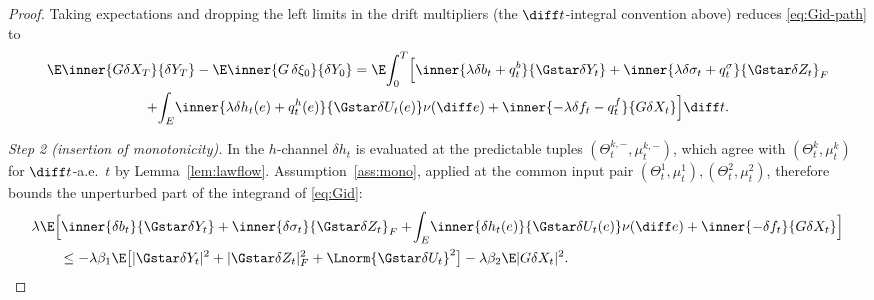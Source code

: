 \begin{proof}
Taking expectations and dropping the left limits in the drift multipliers (the
$\diff t$-integral convention above) reduces \eqref{eq:Gid-path} to
\begin{multline}\label{eq:Gid}
\E\inner{G\delta X_T}{\delta Y_T}-\E\inner{G\,\delta\xi_0}{\delta Y_0}
=\E\!\int_0^T\!\Big[\inner{\lambda\delta b_t+q^b_t}{\Gstar\delta Y_t}
+\inner{\lambda\delta\sigma_t+q^\sigma_t}{\Gstar\delta Z_t}_F\\
+\!\int_E\!\inner{\lambda\delta h_t(e)+q^h_t(e)}{\Gstar\delta U_t(e)}\nu(\diff e)
+\inner{-\lambda\delta f_t-q^f_t}{G\delta X_t}\Big]\diff t .
\end{multline}

\emph{Step 2 (insertion of monotonicity).} In the $h$-channel $\delta h_t$ is evaluated at the
predictable tuples $(\Theta^{k,-}_t,\mu^{k,-}_t)$, which agree with $(\Theta^k_t,\mu^k_t)$
for $\diff t$-a.e.\ $t$ by Lemma~\ref{lem:lawflow}. Assumption~\ref{ass:mono}, applied at
the common input pair $(\Theta^1_t,\mu^1_t),(\Theta^2_t,\mu^2_t)$, therefore bounds the
unperturbed part of the integrand of \eqref{eq:Gid}:
\begin{equation}\label{eq:intmono}
\begin{aligned}
&\lambda\E\Big[\inner{\delta b_t}{\Gstar\delta Y_t}+\inner{\delta\sigma_t}{\Gstar\delta Z_t}_F
+\!\int_E\!\inner{\delta h_t(e)}{\Gstar\delta U_t(e)}\nu(\diff e)+\inner{-\delta f_t}{G\delta X_t}\Big]\\
&\qquad\le-\lambda\beta_1\E\big[|\Gstar\delta Y_t|^2+|\Gstar\delta Z_t|_F^2+\Lnorm{\Gstar\delta U_t}^2\big]
-\lambda\beta_2\E|G\delta X_t|^2 .
\end{aligned}
\end{equation}


\end{proof}

